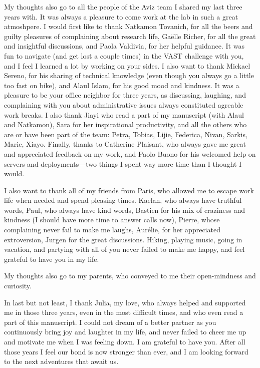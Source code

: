 My thoughts also go to all the people of the Aviz team I shared my last three years with. It was always a pleasure to come work at the lab in such a great atmoshpere.
I would first like to thank Natkamon Tovanich, for all the beers and guilty pleasures of complaining about research life, Gaëlle Richer, for all the great and insightful discussions, and Paola Valdivia, for her helpful guidance.
It was fun to navigate (and get lost a couple times) in the VAST challenge with you, and I feel I learned a lot by working on your sides.
I also want to thank Mickael Sereno, for his sharing of technical knowledge (even though you always go a little too fast on bike), and Alaul Islam, for his good mood and kindness. It was a pleasure to be your office neighbor for three years, as discussing, laughing, and complaining with you about administrative issues always constituted agreable work breaks.
I also thank Jiayi who read a part of my manuscript (with Alaul and Natkamon), Sara for her inspirational productivity, and all the others who are or have been part of the team: Petra, Tobias, Lijie, Federica, Nivan, Sarkis, Marie, Xiayo.
Finally, thanks to Catherine Plaisant, who always gave me great and appreciated feedback on my work, and Paolo Buono for his welcomed help on servers and deployments---two things I spent way more time than I thought I would.


I also want to thank all of my friends from Paris, who allowed me to escape work life when needed and spend pleasing times.
Kaelan, who always have truthful words, Paul, who always have kind words, Bastien for his mix of craziness and kindness (I should have more time to answer calls now), Pierre, whose complaining never fail to make me laughs, Aurélie, for her appreciated extroversion, Jurgen for the great discussions.
Hiking, playing music, going in vacation, and partying with all of you never failed to make me happy, and feel grateful to have you in my life.



My thoughts also go to my parents, who conveyed to me their open-mindness and curiosity.



In last but not least, I thank Julia, my love, who always helped and supported me in those three years, even in the most difficult times, and who even read a part of this manuscript.
I could not dream of a better partner as you continuously bring joy and laughter in my life, and never failed to cheer me up and motivate me when I was feeling down. I am grateful to have you.
After all those years I feel our bond is now stronger than ever, and I am looking forward to the next adventures that await us.










